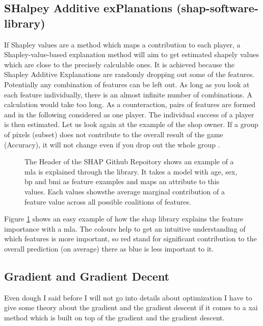 \subsection*{SHalpey Additive exPlanations (shap-software-library)}
If Shapley values are a method which maps a contribution to each player, a Shapley-value-based explanation method will aim to get estimated shapely values which are close to the precisely calculable ones. It is achieved because the Shapley Additive Explanations are randomly dropping out some of the features. Potentially any combination of features can be left out. As long as you look at each feature individually, there is an almost infinite number of combinations. A calculation would take too long. As a counteraction, pairs of features are formed and in the following considered as one player. The individual success of a player is then estimated. Let us look again at the example of the shop owner. If a group of pixels (subset) does not contribute to the overall result of the game (Accuracy), it will not change even if you drop out the whole group \cite{ScottM} \cite{molnar2019} \cite{Lundberg}.\\

\begin{figure}[!htp]
	\centering
	\caption{The Header of the SHAP Github Repoitory shows an example of a \gls{mla} is explained through the library. It takes a model with age, sex, bp and bmi as feature examples and maps an attribute to this values. Each values showsthe average marginal contribution of a feature value across all possible coalitions of features.}
	\label{fig:shap_library_example}
\end{figure}

Figure \ref{fig:shap_library_example} shows an easy example of how the shap library explains the feature importance with a \gls{mla}. The colours help to get an intuitive understanding of which features is more important, so red stand for significant contribution to the overall prediction (on average) there as blue is less important to it. 

\subsection*{Gradient and Gradient Decent}
\label{sec:gd}
Even dough I said before I will not go into details about optimization I have to give some theory about the gradient and the gradient descent if it comes to a \gls{xai} method which is built on top of the gradient and the gradient descent.\\

